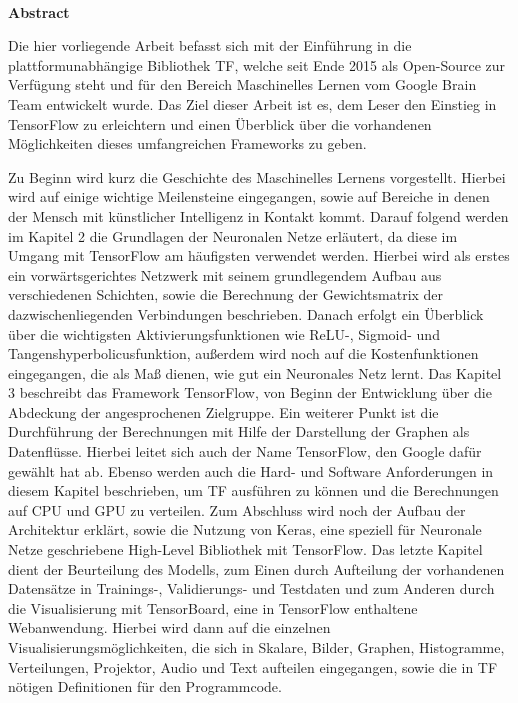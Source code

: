 

\newpage{}

~

\vspace{17.1mm}


\noindent \begin{flushleft}
\textbf{\huge{}Abstract}
\par\end{flushleft}{\huge \par}

Die hier vorliegende Arbeit befasst sich mit der Einführung in die plattformunabhängige Bibliothek \gls{TF}, welche seit Ende 2015 als Open-Source zur Verfügung steht und für den Bereich Maschinelles Lernen vom Google Brain Team entwickelt wurde. Das Ziel dieser Arbeit ist es, dem Leser den Einstieg in TensorFlow zu erleichtern und einen Überblick über die vorhandenen Möglichkeiten dieses umfangreichen Frameworks zu geben.

Zu Beginn wird kurz die Geschichte des Maschinelles Lernens vorgestellt. Hierbei wird auf einige wichtige Meilensteine eingegangen, sowie auf Bereiche in denen der Mensch mit künstlicher Intelligenz in Kontakt kommt. Darauf folgend werden im Kapitel 2  die Grundlagen der Neuronalen Netze erläutert, da diese im Umgang mit TensorFlow am häufigsten verwendet werden. Hierbei wird als erstes ein vorwärtsgerichtes Netzwerk mit seinem grundlegendem Aufbau aus verschiedenen Schichten, sowie die Berechnung der Gewichtsmatrix der dazwischenliegenden Verbindungen beschrieben. Danach erfolgt ein Überblick über die wichtigsten  Aktivierungsfunktionen wie ReLU-, Sigmoid- und Tangenshyperbolicusfunktion, außerdem wird noch auf die Kostenfunktionen eingegangen, die als Maß dienen, wie gut ein Neuronales Netz lernt. Das Kapitel 3 beschreibt das Framework TensorFlow, von Beginn der Entwicklung über die Abdeckung der angesprochenen Zielgruppe. Ein weiterer Punkt ist die  Durchführung der Berechnungen mit Hilfe der Darstellung der Graphen als Datenflüsse. Hierbei leitet sich auch der Name TensorFlow, den Google dafür gewählt hat ab. Ebenso werden auch die Hard- und Software Anforderungen in diesem Kapitel beschrieben, um TF ausführen zu können und die Berechnungen auf CPU und GPU zu verteilen. Zum Abschluss wird noch der Aufbau der Architektur erklärt, sowie die Nutzung von Keras, eine speziell für Neuronale Netze geschriebene High-Level Bibliothek mit TensorFlow. Das letzte Kapitel dient der Beurteilung des Modells, zum Einen durch Aufteilung der vorhandenen Datensätze in Trainings-, Validierungs- und Testdaten und zum Anderen durch die Visualisierung mit TensorBoard, eine in TensorFlow enthaltene Webanwendung. Hierbei wird dann auf die einzelnen Visualisierungsmöglichkeiten, die sich in Skalare, Bilder, Graphen, Histogramme, Verteilungen, Projektor, Audio und Text aufteilen eingegangen, sowie die in TF nötigen Definitionen für den Programmcode.  
